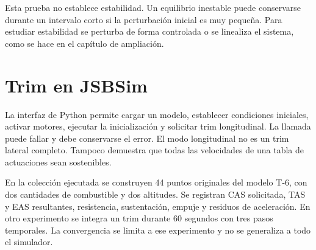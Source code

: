 Esta prueba no establece estabilidad. Un equilibrio inestable puede conservarse durante un intervalo corto si la perturbación inicial es muy pequeña. Para estudiar estabilidad se perturba de forma controlada o se linealiza el sistema, como se hace en el capítulo de ampliación.

\section{Trim en JSBSim}
La interfaz de Python permite cargar un modelo, establecer condiciones iniciales, activar motores, ejecutar la inicialización y solicitar trim longitudinal. La llamada puede fallar y debe conservarse el error. El modo longitudinal no es un trim lateral completo. Tampoco demuestra que todas las velocidades de una tabla de actuaciones sean sostenibles.

En la colección ejecutada se construyen 44 puntos originales del modelo T-6, con dos cantidades de combustible y dos altitudes. Se registran CAS solicitada, TAS y EAS resultantes, resistencia, sustentación, empuje y residuos de aceleración. En otro experimento se integra un trim durante 60 segundos con tres pasos temporales. La convergencia se limita a ese experimento y no se generaliza a todo el simulador.



